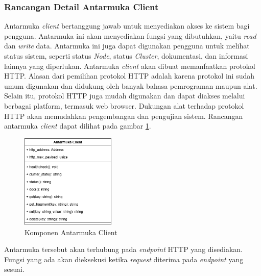 \subsubsection{Rancangan Detail Antarmuka Client}
\label{subsubsection:detail-client-interface}

Antarmuka \textit{client} bertanggung jawab untuk menyediakan akses ke sistem bagi pengguna. Antarmuka ini akan menyediakan fungsi yang dibutuhkan, yaitu \textit{read} dan \textit{write} data. Antarmuka ini juga dapat digunakan pengguna untuk melihat status sistem, seperti status \textit{Node}, status \textit{Cluster}, dokumentasi, dan informasi lainnya yang diperlukan. Antarmuka \textit{client} akan dibuat memanfaatkan protokol HTTP. Alasan dari pemilihan protokol HTTP adalah karena protokol ini sudah umum digunakan dan didukung oleh banyak bahasa pemrograman maupun alat. Selain itu, protokol HTTP juga mudah digunakan dan dapat diakses melalui berbagai platform, termasuk web browser. Dukungan alat terhadap protokol HTTP akan memudahkan pengembangan dan pengujian sistem. Rancangan antarmuka \textit{client} dapat dilihat pada gambar \ref{fig:client-interface-component}.

\begin{figure}[ht]
    \centering
    \includegraphics[width=0.4\textwidth]{resources/chapter-3/client-interface-component.png}
    \caption{Komponen Antarmuka Client}
    \label{fig:client-interface-component}
\end{figure}

Antarmuka tersebut akan terhubung pada \textit{endpoint} HTTP yang disediakan. Fungsi yang ada akan dieksekusi ketika \textit{request} diterima pada \textit{endpoint} yang sesuai.